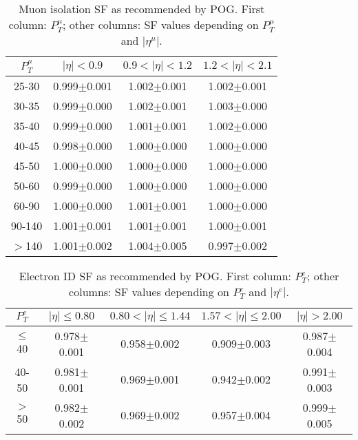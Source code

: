 \begin{table}[h]
  \footnotesize
  \begin{center}
  \caption{Muon isolation SF as recommended by POG. First column: $P_T^{\mu}$; other columns: SF values depending on $P_T^{\mu}$ and $|\eta^{\mu}|$.} 
   \begin{tabular}{|c|c|c|c|}
 $P_T^{\mu}$  & $|\eta|< 0.9$   & $0.9<|\eta|< 1.2$    & $1.2<|\eta|< 2.1$ \\ \hline
25-30          & 0.999$\pm$0.001   & 1.002$\pm$0.001    & 1.002$\pm$0.001     \\ \hline
30-35          & 0.999$\pm$0.000   & 1.002$\pm$0.001    & 1.003$\pm$0.000        \\ \hline
35-40          & 0.999$\pm$0.000   & 1.001$\pm$0.001    & 1.002$\pm$0.000        \\ \hline
40-45          & 0.998$\pm$0.000   & 1.000$\pm$0.000    & 1.000$\pm$0.000        \\ \hline
45-50          & 1.000$\pm$0.000   & 1.000$\pm$0.000    & 1.000$\pm$0.000        \\ \hline
50-60          & 0.999$\pm$0.000   & 1.000$\pm$0.000    & 1.000$\pm$0.000        \\ \hline
60-90          & 1.000$\pm$0.000   & 1.001$\pm$0.001    & 1.000$\pm$0.000        \\ \hline
90-140         & 1.001$\pm$0.001   & 1.001$\pm$0.001    & 1.000$\pm$0.001        \\ \hline
$>$140         & 1.001$\pm$0.002   & 1.004$\pm$0.005    & 0.997$\pm$0.002        \\ \hline
  \end{tabular}
  \label{tab:SFs_MuonIso}
  \end{center}
\end{table}

\begin{table}[h]
  \footnotesize
  \begin{center}
  \caption{Electron ID SF as recommended by POG. First column: $P_T^{e}$; other columns: SF values depending on $P_T^{e}$ and $|\eta^{e}|$.} 
   \begin{tabular}{|c|c|c|c|c|}
 $P_T^{e}$  & $|\eta|\leq 0.80$ & $0.80<|\eta|\leq 1.44$ & $1.57<|\eta|\leq 2.00$ & $|\eta|> 2.00$\\ \hline
$\leq$40       & 0.978$\pm$0.001   & 0.958$\pm$0.002        & 0.909$\pm$0.003        & 0.987$\pm$0.004 \\ \hline
40-50          & 0.981$\pm$0.001   & 0.969$\pm$0.001        & 0.942$\pm$0.002        & 0.991$\pm$0.003 \\ \hline
$>$50            & 0.982$\pm$0.002   & 0.969$\pm$0.002        & 0.957$\pm$0.004        & 0.999$\pm$0.005 \\ \hline
  \end{tabular}
  \label{tab:SFs_ElectronID}
  \end{center}
\end{table}

